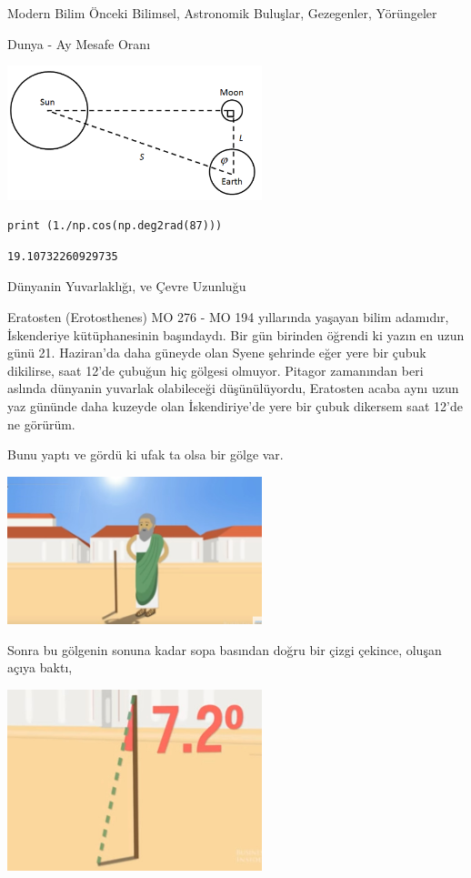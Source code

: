 \documentclass[12pt,fleqn]{article}\usepackage{../../common}
\begin{document}
Modern Bilim Önceki Bilimsel, Astronomik Buluşlar, Gezegenler, Yörüngeler

Dunya - Ay Mesafe Oranı

\includegraphics[width=20em]{sunmoon.png}

\begin{verbatim}
print (1./np.cos(np.deg2rad(87)))
\end{verbatim}

\begin{verbatim}
19.10732260929735
\end{verbatim}

Dünyanin Yuvarlaklığı, ve Çevre Uzunluğu

Eratosten (Erotosthenes) MO 276 - MO 194 yıllarında yaşayan bilim adamıdır,
İskenderiye kütüphanesinin başındaydı. Bir gün birinden öğrendi ki yazın en uzun
günü 21. Haziran'da daha güneyde olan Syene şehrinde eğer yere bir çubuk
dikilirse, saat 12'de çubuğun hiç gölgesi olmuyor. Pitagor zamanından beri
aslında dünyanin yuvarlak olabileceği düşünülüyordu, Eratosten acaba aynı uzun
yaz gününde daha kuzeyde olan İskendiriye'de yere bir çubuk dikersem saat 12'de
ne görürüm.

Bunu yaptı ve gördü ki ufak ta olsa bir gölge var. 

\includegraphics[width=20em]{circum3.jpg}

Sonra bu gölgenin sonuna kadar sopa basından doğru bir çizgi çekince, oluşan
açıya baktı,

\includegraphics[width=20em]{circum4.jpg}
\end{document}
